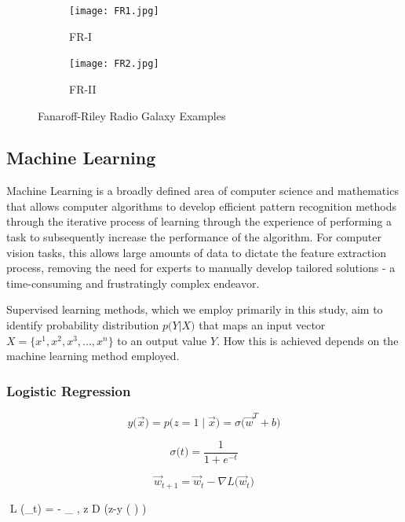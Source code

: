 \documentclass{article}
\begin{document}
\begin{figure}
 
    \begin{subfigure}[b]{0.5\textwidth}
        \texttt{[image: FR1.jpg]} 
        \caption{FR-I}
        \label{fig:subim1}
    \end{subfigure}
    \begin{subfigure}[b]{0.5\textwidth}
        \texttt{[image: FR2.jpg]}
        \caption{FR-II}
        \label{fig:subim2}
    \end{subfigure}
 
    \caption{Fanaroff-Riley Radio Galaxy Examples}
    \label{fig:image2}
\end{figure}


\subsection{\label{sec:level2}Machine Learning}


Machine Learning is a broadly defined area of computer science and mathematics that allows computer algorithms to develop efficient pattern recognition methods through the iterative process of learning through the experience of performing a task to subsequently increase the performance of the algorithm. For computer vision tasks, this allows large amounts of data to dictate the feature extraction process, removing the need for experts to manually develop tailored solutions - a time-consuming and frustratingly complex endeavor. 

Supervised learning methods, which we employ primarily in this study, aim to identify probability distribution \(p \big(Y |  X \big)\) that maps an input vector \(X = \big\{x^1, x^2, x^3, ..., x^n\big\}\) to an output value \(Y\). How this is achieved depends on the machine learning method employed. 

\subsubsection{\label{sec:level3}Logistic Regression}

$$
y \big( \overrightarrow{x} \big) = p \big(z=1 \mid  \overrightarrow{x} \big) =  \sigma  \big( \overrightarrow{w}^{T}+b \big) 
$$

$$
 \sigma  \big(t\big) = \frac{1}{1+e^{-t}}
$$ 

$$
\overrightarrow{w}_{t+1} = \overrightarrow{w}_{t} -  \nabla L \big(\overrightarrow{w}_{t}\big) 
$$
 
$$
\nabla L \big(_{t}\big) =  -  \sum_{ , z \in D } \big(z-y \big(  \big) \big)
\end{document}
